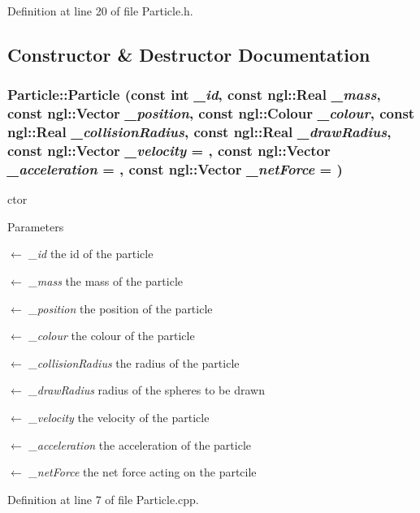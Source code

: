 Definition at line 20 of file Particle.h.



\subsection{Constructor \& Destructor Documentation}
\hypertarget{class_particle_a6210a8af42489bad229736c176f9d1c9}{
\subsubsection[{Particle}]{\setlength{\rightskip}{0pt plus 5cm}Particle::Particle (const int {\em \_\-id}, \/  const ngl::Real {\em \_\-mass}, \/  const ngl::Vector {\em \_\-position}, \/  const ngl::Colour {\em \_\-colour}, \/  const ngl::Real {\em \_\-collisionRadius}, \/  const ngl::Real {\em \_\-drawRadius}, \/  const ngl::Vector {\em \_\-velocity} = {}, \/  const ngl::Vector {\em \_\-acceleration} = {}, \/  const ngl::Vector {\em \_\-netForce} = {})}}
\label{class_particle_a6210a8af42489bad229736c176f9d1c9}


ctor 


\begin{DoxyParams}{Parameters}
\item[\mbox{$\leftarrow$} {\em \_\-id}]the id of the particle \item[\mbox{$\leftarrow$} {\em \_\-mass}]the mass of the particle \item[\mbox{$\leftarrow$} {\em \_\-position}]the position of the particle \item[\mbox{$\leftarrow$} {\em \_\-colour}]the colour of the particle \item[\mbox{$\leftarrow$} {\em \_\-collisionRadius}]the radius of the particle \item[\mbox{$\leftarrow$} {\em \_\-drawRadius}]radius of the spheres to be drawn \item[\mbox{$\leftarrow$} {\em \_\-velocity}]the velocity of the particle \item[\mbox{$\leftarrow$} {\em \_\-acceleration}]the acceleration of the particle \item[\mbox{$\leftarrow$} {\em \_\-netForce}]the net force acting on the partcile \end{DoxyParams}


Definition at line 7 of file Particle.cpp.




